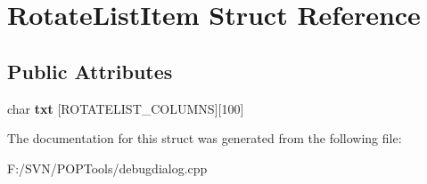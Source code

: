 \hypertarget{struct_rotate_list_item}{\section{Rotate\-List\-Item Struct Reference}
\label{struct_rotate_list_item}
}
\subsection*{Public Attributes}
\begin{DoxyCompactItemize}
\item 
\hypertarget{struct_rotate_list_item_a6b034bd8af0cf224b58a8fb19789f57d}{char {\bfseries txt} \mbox{[}R\-O\-T\-A\-T\-E\-L\-I\-S\-T\-\_\-\-C\-O\-L\-U\-M\-N\-S\mbox{]}\mbox{[}100\mbox{]}}\label{struct_rotate_list_item_a6b034bd8af0cf224b58a8fb19789f57d}

\end{DoxyCompactItemize}


The documentation for this struct was generated from the following file\-:\begin{DoxyCompactItemize}
\item 
F\-:/\-S\-V\-N/\-P\-O\-P\-Tools/debugdialog.\-cpp\end{DoxyCompactItemize}
